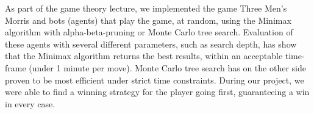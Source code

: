 As part of the game theory lecture, we implemented the game Three Men's Morris and bots (agents) that play the game, at random, using the Minimax algorithm with alpha-beta-pruning or Monte Carlo tree search.
Evaluation of these agents with several different parameters, such as search depth, has show that the Minimax algorithm returns the best results, within an acceptable time-frame (under 1 minute per move).
Monte Carlo tree search has on the other side proven to be most efficient under strict time constraints.
During our project, we were able to find a winning strategy for the player going first, guaranteeing a win in every case.